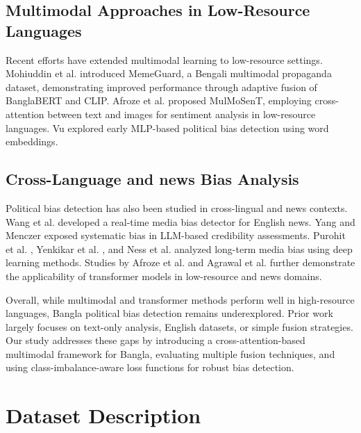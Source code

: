 \documentclass[11pt]{article}
\begin{document}
\subsection{Multimodal Approaches in Low-Resource Languages}
Recent efforts have extended multimodal learning to low-resource settings. Mohiuddin et al. \citep{mohiuddin2025memeguard} introduced MemeGuard, a Bengali multimodal propaganda dataset, demonstrating improved performance through adaptive fusion of BanglaBERT and CLIP. Afroze et al. \citep{afroze2026mulmosent} proposed MulMoSenT, employing cross-attention between text and images for sentiment analysis in low-resource languages. Vu \citep{vu2017politicalbias} explored early MLP-based political bias detection using word embeddings. 

\subsection{Cross-Language and news Bias Analysis}
Political bias detection has also been studied in cross-lingual and news contexts. Wang et al. \citep{wang2025mediabias} developed a real-time media bias detector for English news. Yang and Menczer \citep{yang2025llmcredibility} exposed systematic bias in LLM-based credibility assessments. Purohit et al. \citep{purohit2025mediasentiment}, Yenkikar et al. \citep{yenkikar2022sentinet}, and Ness et al. \citep{ness2023data} analyzed long-term media bias using deep learning methods. Studies by Afroze et al. \citep{afroze2026mulmosent} and Agrawal et al. \citep{agrawal2022hindi} further demonstrate the applicability of transformer models in low-resource and news domains.


Overall, while multimodal and transformer methods perform well in high-resource languages, Bangla political bias detection remains underexplored. Prior work largely focuses on text-only analysis, English datasets, or simple fusion strategies. Our study addresses these gaps by introducing a cross-attention-based multimodal framework for Bangla, evaluating multiple fusion techniques, and using class-imbalance-aware loss functions for robust bias detection.

\section{Dataset Description}\label{sec:dataset}
\end{document}
